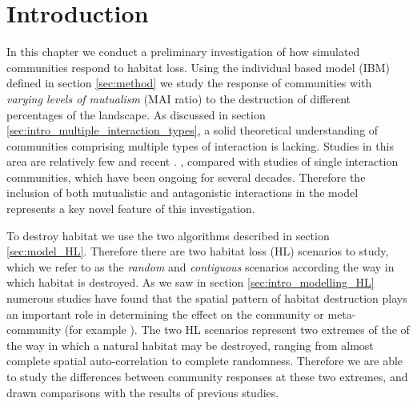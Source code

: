 \section{Introduction}
\label{sec:intro}

In this chapter we conduct a preliminary investigation of how simulated communities respond to habitat loss. Using the individual based model (IBM) defined in section \ref{sec:method} we study the response of communities with \emph{varying levels of mutualism} (MAI ratio) to the destruction of different percentages of the landscape. As discussed in section \ref{sec:intro_multiple_interaction_types}, a solid theoretical understanding of communities comprising multiple types of interaction is lacking. Studies in this area are relatively few and recent \cite{sauve2014structure,fontaine2011ecological,kefi2012more,pocock2012robustness,mougi2012diversity,evans2013robustness}. , compared with studies of single interaction communities, which have been ongoing for several decades. Therefore the inclusion of both mutualistic and antagonistic interactions in the model represents a key novel feature of this investigation.  

To destroy habitat we use the two algorithms described in section \ref{sec:model_HL}. Therefore there are two habitat loss (HL) scenarios to study, which we refer to as the \emph{random} and \emph{contiguous} scenarios according the way in which habitat is destroyed. As we saw in section \ref{sec:intro_modelling_HL} numerous studies have found that the spatial pattern of habitat destruction plays an important role in determining the effect on the community or meta-community (for example \cite{ovaskainen2002metapopulation,jager2006simulated,sole2006ecological}). The two HL scenarios represent two extremes of the of the way in which a natural habitat may be destroyed, ranging from almost complete spatial auto-correlation to complete randomness. Therefore we are able to study the differences between community responses at these two extremes, and drawn comparisons with the results of previous studies.

